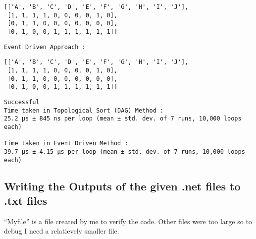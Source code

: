 \documentclass[11pt]{article}
\begin{document}
    
    \begin{Verbatim}[commandchars=\\\{\}]
[['A', 'B', 'C', 'D', 'E', 'F', 'G', 'H', 'I', 'J'],
 [1, 1, 1, 1, 0, 0, 0, 0, 1, 0],
 [0, 1, 1, 0, 0, 0, 0, 0, 0, 0],
 [0, 1, 0, 0, 1, 1, 1, 1, 1, 1]]
    \end{Verbatim}

    
    \begin{Verbatim}[commandchars=\\\{\}]
Event Driven Approach :
    \end{Verbatim}

    
    \begin{Verbatim}[commandchars=\\\{\}]
[['A', 'B', 'C', 'D', 'E', 'F', 'G', 'H', 'I', 'J'],
 [1, 1, 1, 1, 0, 0, 0, 0, 1, 0],
 [0, 1, 1, 0, 0, 0, 0, 0, 0, 0],
 [0, 1, 0, 0, 1, 1, 1, 1, 1, 1]]
    \end{Verbatim}

    
    \begin{Verbatim}[commandchars=\\\{\}]
Successful
Time taken in Topological Sort (DAG) Method :
25.2 µs ± 845 ns per loop (mean ± std. dev. of 7 runs, 10,000 loops each)

Time taken in Event Driven Method :
39.7 µs ± 4.15 µs per loop (mean ± std. dev. of 7 runs, 10,000 loops each)
    \end{Verbatim}
\pagebreak

    \hypertarget{writing-the-outputs-of-the-given-.net-files-to-.txt-files}{%
\subsection{Writing the Outputs of the given .net files to .txt
files}\label{writing-the-outputs-of-the-given-.net-files-to-.txt-files}}

``Myfile'' is a file created by me to verify the code. Other files were
too large so to debug I need a relatievely smaller file.
\end{document}
